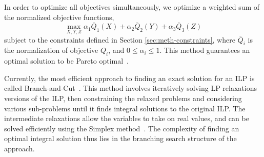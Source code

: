In order to optimize all objectives simultaneously, we optimize a weighted sum
of the normalized objective functions,
\begin{equation}
\max_{X, Y, Z} \alpha_1 \bar{Q}_1(X) + \alpha_2 \bar{Q}_2(Y) + \alpha_3
\bar{Q}_3(Z)
\end{equation}
subject to the constraints defined in Section \ref{sec:meth-constraints},
where $\bar{Q}_i$ is the normalization of objective $Q_i$, and $0 \leq \alpha_i \leq 1$. 
This method guarantees an optimal solution to be Pareto optimal~\cite{stanimirovic_linear_2011}. 

Currently, the most efficient approach to finding an exact solution for 
an ILP is called Branch-and-Cut~\cite{mitchell_branch-and-cut_2002}. 
This method involves iteratively solving 
LP relaxations versions of the ILP, then constraining the relaxed problems and
considering various sub-problems until it finds integral solutions to the 
original ILP.
The intermediate relaxations allow the variables to take on real values, 
and can be solved efficiently using the Simplex method~\cite{shamir_efficiency_1987}. The 
complexity of finding an optimal integral solution thus lies in the 
branching search structure of the approach.



